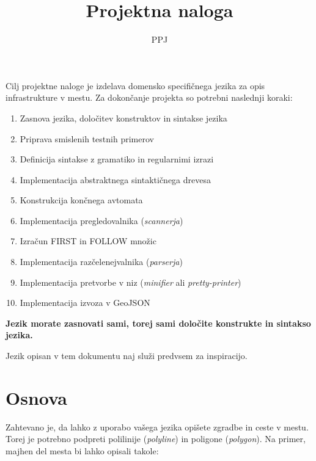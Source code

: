 \documentclass{article}
\title{Projektna naloga}
\author{PPJ}
\begin{document}
\maketitle

Cilj projektne naloge je izdelava domensko specifičnega jezika za opis infrastrukture v mestu.
Za dokončanje projekta so potrebni naslednji koraki:

\begin{enumerate}
\item Zasnova jezika, določitev konstruktov in sintakse jezika
\item Priprava smislenih testnih primerov
\item Definicija sintakse z gramatiko in regularnimi izrazi
\item Implementacija abstraktnega sintaktičnega drevesa
\item Konstrukcija končnega avtomata
\item Implementacija pregledovalnika (\emph{scannerja})
\item Izračun \textsc{FIRST} in \textsc{FOLLOW} množic
\item Implementacija razčelenejvalnika (\emph{parserja})
\item Implementacija pretvorbe v niz (\emph{minifier} ali \emph{pretty-printer})
\item Implementacija izvoza v GeoJSON
\end{enumerate}

\textbf{Jezik morate zasnovati sami, torej sami določite konstrukte in sintakso jezika.}

Jezik opisan v tem dokumentu naj služi predvsem za inspiracijo.

\newpage
\section{Osnova}
Zahtevano je, da lahko z uporabo vašega jezika opišete zgradbe in ceste v mestu.
Torej je potrebno podpreti polilinije (\emph{polyline}) in poligone (\emph{polygon}).
Na primer, majhen del mesta bi lahko opisali takole:
\end{document}
